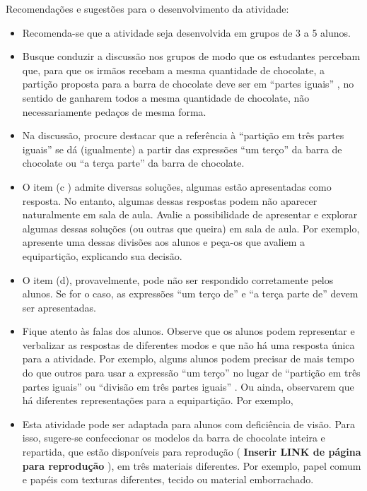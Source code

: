 \documentclass[oneside]{book}
\begin{document}
\begin{multicols}{2}
  Recomendações e sugestões para o desenvolvimento da atividade:
\begin{itemize} %
    \item       Recomenda-se que a atividade seja desenvolvida em grupos de 3 a 5 alunos.
    \item       Busque conduzir a discussão nos grupos de modo que os estudantes percebam que, para que os irmãos recebam a mesma quantidade de chocolate, a partição proposta para a barra de chocolate deve ser em       ``partes iguais''      , no sentido de ganharem todos a mesma quantidade de chocolate, não necessariamente pedaços de mesma forma.
    \item       Na discussão, procure destacar que a referência à       ``partição em três partes iguais''       se dá (igualmente) a partir das expressões       ``um terço''       da barra de chocolate ou       ``a terça parte''       da barra de chocolate.
    \item       O item (c ) admite diversas soluções, algumas estão apresentadas como resposta. No entanto, algumas dessas respostas podem não aparecer naturalmente em sala de aula. Avalie a possibilidade de apresentar e explorar algumas dessas soluções (ou outras que queira) em sala de aula. Por exemplo, apresente uma dessas divisões aos alunos e peça-os que avaliem a equipartição, explicando sua decisão.
    \item       O item (d), provavelmente, pode não ser respondido corretamente pelos alunos. Se for o caso, as expressões       ``um terço de''       e       ``a terça parte de''       devem ser apresentadas.
    \item       Fique atento às falas dos alunos. Observe que os alunos podem representar e verbalizar as respostas de diferentes modos e que não há uma resposta única para a atividade. Por exemplo, alguns alunos podem precisar de mais tempo do que outros para usar a expressão       ``um terço''       no lugar de       ``partição em três partes iguais''       ou       ``divisão em três partes iguais''      . Ou ainda, observarem que há diferentes representações para a equipartição. Por exemplo,
\end{itemize} %


\begin{itemize} %
    \item       Esta atividade pode ser adaptada para alunos com deficiência de visão. Para isso, sugere-se confeccionar os modelos da barra de chocolate  inteira e repartida, que estão disponíveis para reprodução (      {\bf Inserir LINK de página para reprodução}      ), em três materiais diferentes. Por exemplo, papel comum e papéis com texturas diferentes, tecido ou material emborrachado.
\end{itemize} %


\end{multicols}
\end{document}
